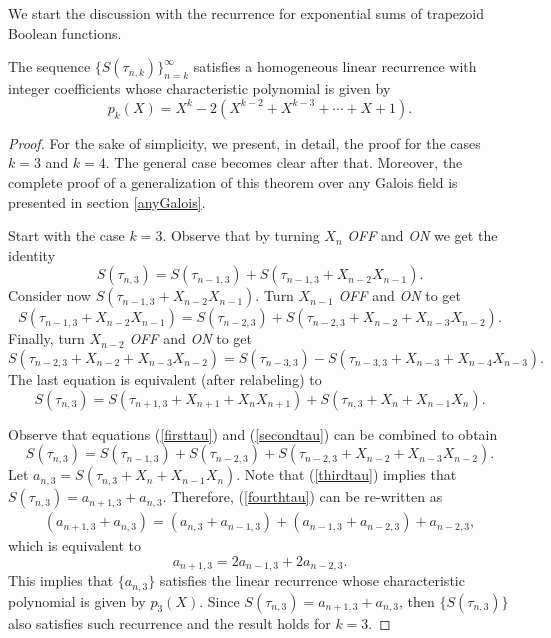 We start the discussion with the recurrence for exponential sums of trapezoid Boolean functions.

\begin{theorem}
\label{trapezoidTHM}
 The sequence $\{S(\tau_{n,k})\}_{n=k}^\infty$ satisfies a homogeneous linear recurrence with integer coefficients whose characteristic polynomial is given by 
 \begin{equation}
 \label{charpoly}
  p_k(X)=X^k -2 (X^{k-2}+X^{k-3}+\cdots+X+1).
 \end{equation}
\end{theorem}
\begin{proof}
For the sake of simplicity, we present, in detail, the proof for the cases $k=3$ and $k=4$.  The general case becomes clear after that.  Moreover, the complete proof of a generalization of this theorem over any Galois field is presented in section \ref{anyGalois}.
 
Start with the case $k=3$.  Observe that by turning $X_n$ {\it OFF} and {\it ON} we get the identity
 \begin{equation}
 \label{firsttau}
  S(\tau_{n,3}) = S(\tau_{n-1,3})+S(\tau_{n-1,3}+X_{n-2}X_{n-1}).
 \end{equation}
Consider now $S(\tau_{n-1,3}+X_{n-2}X_{n-1})$.  Turn $X_{n-1}$ {\it OFF} and {\it ON} to get
\begin{equation}
\label{secondtau}
 S(\tau_{n-1,3}+X_{n-2}X_{n-1})=S(\tau_{n-2,3})+S(\tau_{n-2,3}+X_{n-2}+X_{n-3}X_{n-2}).
\end{equation}
Finally, turn $X_{n-2}$ {\it OFF} and {\it ON} to get
\begin{equation}
 S(\tau_{n-2,3}+X_{n-2}+X_{n-3}X_{n-2})=S(\tau_{n-3,3})-S(\tau_{n-3,3}+X_{n-3}+X_{n-4}X_{n-3}).
\end{equation}
The last equation is equivalent (after relabeling) to 
\begin{equation}
\label{thirdtau}
S(\tau_{n,3})=S(\tau_{n+1,3}+X_{n+1}+X_{n}X_{n+1})+S(\tau_{n,3}+X_{n}+X_{n-1}X_{n}).
\end{equation}

Observe that equations (\ref{firsttau}) and (\ref{secondtau}) can be combined to obtain
\begin{equation}
\label{fourthtau}
S(\tau_{n,3})=S(\tau_{n-1,3})+S(\tau_{n-2,3})+ S(\tau_{n-2,3}+X_{n-2}+X_{n-3}X_{n-2}).
\end{equation}
Let $a_{n,3} =S(\tau_{n,3}+X_{n}+X_{n-1}X_{n})$.  Note that (\ref{thirdtau}) implies that $S(\tau_{n,3})=a_{n+1,3}+a_{n,3}$.  Therefore, (\ref{fourthtau}) can be re-written as
\begin{eqnarray}
(a_{n+1,3}+a_{n,3}) = (a_{n,3}+a_{n-1,3})+(a_{n-1,3}+a_{n-2,3})+a_{n-2,3},
\end{eqnarray}
which is equivalent to 
\begin{equation}
a_{n+1,3} = 2a_{n-1,3}+2a_{n-2,3}.
\end{equation}
This implies that $\{a_{n,3}\}$ satisfies the linear recurrence whose characteristic polynomial is given by $p_3(X)$.  Since $S(\tau_{n,3})=a_{n+1,3}+a_{n,3}$, then $\{S(\tau_{n,3})\}$ also satisfies such recurrence and the result holds for $k=3$.


\end{proof}
